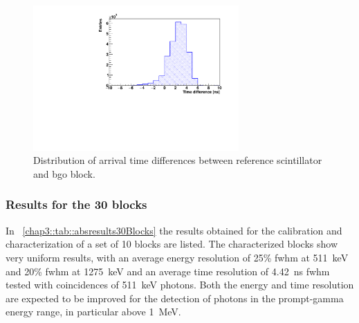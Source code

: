 \begin{figure}
 \centering
  \includegraphics[width=0.7\textwidth]{03_GraphicFiles/chapter3_CLaRySproto/Absorber/images/timeDiff_distr.pdf}
  \caption{Distribution of arrival time differences between reference scintillator and \gls{bgo} block.}	
  \label{chap3::fig::abstimeDiff}
\end{figure}

\subsubsection{Results for the 30 blocks}\label{chap3::subsubsec::30blocksRes}

In \tablename~\ref{chap3::tab::absresults30Blocks} the results obtained for the calibration and characterization of a set of 10 blocks are listed.
The characterized blocks show very uniform results, with an average energy resolution of 25\% \gls{fwhm} at 511~keV and 20\% \gls{fwhm} at 1275~keV and an average time resolution of 4.42~ns \gls{fwhm} tested with coincidences of 511~keV photons. Both the energy and time resolution are expected to be improved for the detection of photons in the prompt-gamma energy range, in particular above 1~MeV.

